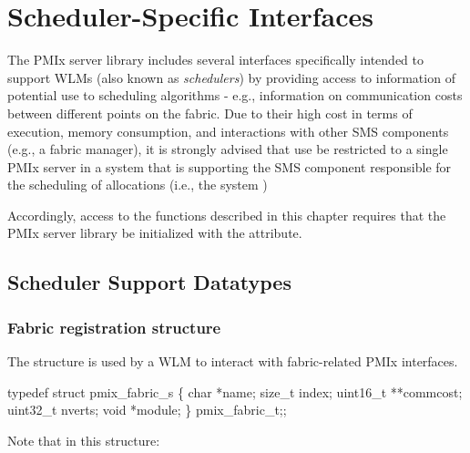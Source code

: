 \chapter{Scheduler-Specific Interfaces}
\label{chap:api_scheduler}

The \ac{PMIx} server library includes several interfaces specifically intended to support \acp{WLM} (also known as \emph{schedulers}) by providing access to information of potential use to scheduling algorithms - e.g., information on communication costs between different points on the fabric. Due to their high cost in terms of execution, memory consumption, and interactions with other \ac{SMS} components (e.g., a fabric manager), it is strongly advised that use be restricted to a single \ac{PMIx} server in a system that is supporting the \ac{SMS} component responsible for the scheduling of allocations (i.e., the system )

Accordingly, access to the functions described in this chapter requires that the \ac{PMIx} server library be initialized with the  attribute.

\section{Scheduler Support Datatypes}

\subsection{Fabric registration structure}

The  structure is used by a \ac{WLM} to interact with fabric-related \ac{PMIx} interfaces.

\cspecificstart
\begin{codepar}
typedef struct pmix_fabric_s \{
    char *name;
    size_t index;
    uint16_t **commcost;
    uint32_t nverts;
    void *module;
\} pmix_fabric_t;;
\end{codepar}
\cspecificend

Note that in this structure:

